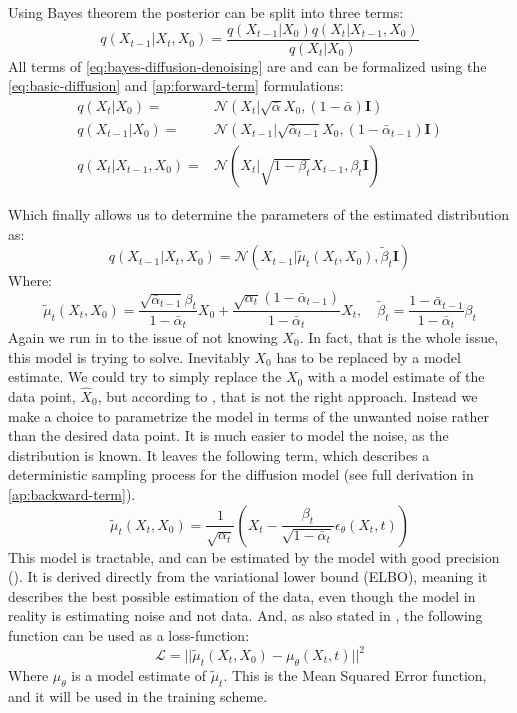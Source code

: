 Using Bayes theorem the posterior can be split into three terms:
\begin{equation} \label{eq:bayes-diffusion-denoising}
    q(X_{t-1}|X_{t}, X_0) = \frac{q(X_{t-1}|X_0)q(X_t|X_{t-1},X_0)}{q(X_t|X_0)}
\end{equation}
All terms of \cref{eq:bayes-diffusion-denoising} are and can be formalized using the \autoref{eq:basic-diffusion} and \autoref{ap:forward-term} formulations:
\begin{align}
    q(X_t|X_0) =& \mathcal{N}(X_t| \sqrt{\bar{\alpha}}X_0, (1-\bar{\alpha})\mathbf{I}) \\
    q(X_{t-1}|X_0) =& \mathcal{N}(X_{t-1}| \sqrt{\bar{\alpha}_{t-1}}X_0, (1-\bar{\alpha}_{t-1})\mathbf{I})\\
    q(X_t|X_{t-1},X_0) =& \mathcal{N}(X_t| \sqrt{1-\beta_t}X_{t-1}, \beta_t \mathbf{I})
\end{align}

Which finally allows us to determine the parameters of the estimated distribution as:
\begin{equation} \label{eq:forward-process-distribution}
    q(X_{t-1}|X_{t}, X_0) = \mathcal{N}(X_{t-1}| \tilde{\mu}_t(X_t, X_0), \tilde{\beta}_t \mathbf{I})
\end{equation}
Where:
\begin{equation*} \label{eq:estimated-mean}
    \tilde{\mu}_t(X_t, X_0) = \frac{\sqrt{\bar{\alpha}_{t-1}}\beta_t}{1-\bar{\alpha}_t}X_0 + \frac{\sqrt{\alpha_t}(1-\bar{\alpha}_{t-1})}{1-\bar{\alpha}_t}X_t, \quad \tilde{\beta}_t = \frac{1-\bar{\alpha}_{t-1}}{1-\bar{\alpha}_t}\beta_t
\end{equation*}
Again we run in to the issue of not knowing $X_0$. In fact, that is the whole issue, this model is trying to solve. Inevitably $X_0$ has to be replaced by a model estimate. We could try to simply replace the $X_0$ with a model estimate of the data point, $\hat{X}_0$, but according to \cite{ddpm}, that is not the right approach. Instead we make a choice to parametrize the model in terms of the unwanted noise rather than the desired data point. It is much easier to model the noise, as the distribution is known. It leaves the following term, which describes a deterministic sampling process for the diffusion model (see full derivation in \autoref{ap:backward-term}).
\begin{equation} \label{eq:diffusion-mean}
    \tilde{\mu}_t(X_t, X_0) = \frac{1}{\sqrt{\alpha_t}} \left( X_t - \frac{\beta_t}{\sqrt{1-\bar{\alpha}_t}} \epsilon_{\theta}(X_t,t) \right)
\end{equation}
This model is tractable, and can be estimated by the model with good precision (\cite{ddpm}). It is derived directly from the variational lower bound (ELBO), meaning it describes the best possible estimation of the data, even though the model in reality is estimating noise and not data. And, as also stated in \cite{ddpm}, the following function can be used as a loss-function:
\begin{equation}
    \mathcal{L} = ||\tilde{\mu}_t(X_t, X_0) - \mu_{\theta}(X_t, t)||^2
\end{equation}
Where $\mu_{\theta}$ is a model estimate of $\tilde{\mu}_t$. This is the Mean Squared Error function, and it will be used in the training scheme.

